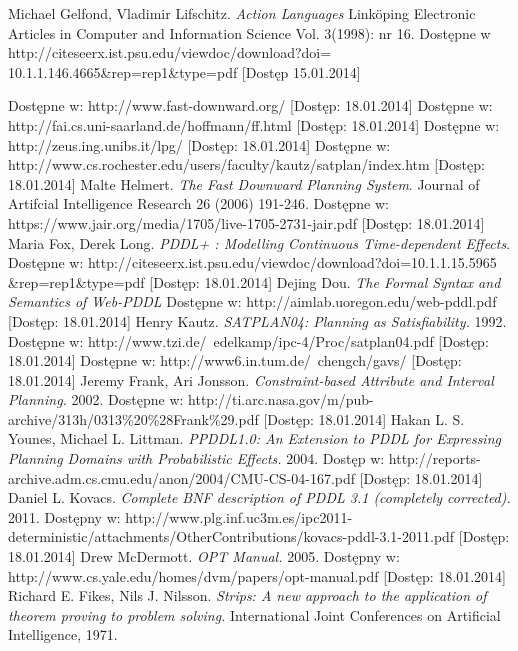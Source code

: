 
\begin{thebibliography}{1}
 Michael Gelfond, Vladimir Lifschitz. \emph{Action Languages} Linköping Electronic Articles in
Computer and Information Science
Vol. 3(1998): nr 16. Dostępne w http://citeseerx.ist.psu.edu/viewdoc/download?doi= 10.1.1.146.4665\&{}rep=rep1\&{}type=pdf [Dostęp 15.01.2014]

 Dostępne w: http://www.fast-downward.org/ [Dostęp: 18.01.2014]
 Dostępne w: http://fai.cs.uni-saarland.de/hoffmann/ff.html [Dostęp: 18.01.2014]
 Dostępne w: http://zeus.ing.unibs.it/lpg/ [Dostęp: 18.01.2014]
 Dostępne w: http://www.cs.rochester.edu/users/faculty/kautz/satplan/index.htm [Dostęp: 18.01.2014]
 Malte Helmert. \emph{The Fast Downward Planning System}. Journal of Artifcial Intelligence Research 26 (2006) 191-246. Dostępne w: https://www.jair.org/media/1705/live-1705-2731-jair.pdf [Dostęp: 18.01.2014]
 Maria Fox, Derek Long. \emph{PDDL+ : Modelling Continuous Time-dependent Effects}. Dostępne w: http://citeseerx.ist.psu.edu/viewdoc/download?doi=10.1.1.15.5965 \&{}rep=rep1\&{}type=pdf [Dostęp: 18.01.2014]
 Dejing Dou. \emph{The Formal Syntax and Semantics of Web-PDDL} Dostępne w: http://aimlab.uoregon.edu/web-pddl.pdf [Dostęp: 18.01.2014]
 Henry Kautz. \emph{SATPLAN04: Planning as Satisfiability.} 1992. Dostępne w:
http://www.tzi.de/~edelkamp/ipc-4/Proc/satplan04.pdf [Dostęp: 18.01.2014]
 Dostępne w: http://www6.in.tum.de/~chengch/gavs/ [Dostęp: 18.01.2014]
 Jeremy Frank, Ari Jonsson. \emph{Constraint-based Attribute and Interval Planning.} 2002. Dostępne w:
http://ti.arc.nasa.gov/m/pub-archive/313h/0313\%20\%28Frank\%29.pdf [Dostęp: 18.01.2014] 
 Hakan L. S. Younes, Michael L. Littman. \emph{PPDDL1.0: An Extension to PDDL for Expressing
Planning Domains with Probabilistic Effects.} 2004. Dostęp w: http://reports-archive.adm.cs.cmu.edu/anon/2004/CMU-CS-04-167.pdf [Dostęp: 18.01.2014]
Daniel L. Kovacs. \emph{Complete BNF description of PDDL 3.1 (completely corrected).} 2011. Dostępny w: http://www.plg.inf.uc3m.es/ipc2011-deterministic/attachments/OtherContributions/kovacs-pddl-3.1-2011.pdf [Dostęp: 18.01.2014]
 Drew McDermott. \emph{OPT Manual.} 2005. Dostępny w: http://www.cs.yale.edu/homes/dvm/papers/opt-manual.pdf [Dostęp: 18.01.2014]
 Richard E. Fikes, Nils J. Nilsson. \emph{Strips: A new approach to the application of theorem proving to problem solving.} International Joint Conferences on Artificial Intelligence, 1971.

\end{thebibliography}
